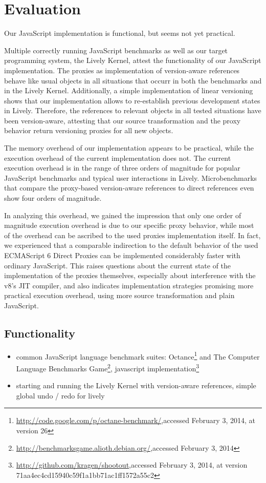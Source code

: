 \chapter{Evaluation} \label{sec:EVALUATION}

Our JavaScript implementation is functional, but seems not yet practical.

Multiple correctly running JavaScript benchmarks as well as our target programming system, the Lively Kernel, attest the functionality of our JavaScript implementation.
The proxies as implementation of version-aware references behave like usual objects in all situations that occurr in both the benchmarks and in the Lively Kernel.
Additionally, a simple implementation of linear versioning shows that our implementation allows to re-establish previous development states in Lively.
Therefore, the references to relevant objects in all tested situations have been version-aware, attesting that our source transformation and the proxy behavior return versioning proxies for all new objects. 

The memory overhead of our implementation appears to be practical, while the execution overhead of the current implementation does not.
The current execution overhead is in the range of three orders of magnitude for popular JavaScript benchmarks and typical user interactions in Lively.
Microbenchmarks that compare the proxy-based version-aware references to direct references even show four orders of magnitude.

In analyzing this overhead, we gained the impression that only one order of magnitude execution overhead is due to our specific proxy behavior, while most of the overhead can be ascribed to the used proxies implementation itself.
In fact, we experienced that a comparable indirection to the default behavior of the used ECMAScript 6 Direct Proxies can be implemented considerably faster with ordinary JavaScript.
This raises questions about the current state of the implementation of the proxies themselves, especially about interference with the v8's JIT compiler, and also indicates implementation strategies promising more practical execution overhead, using more source transformation and plain JavaScript.

\section{Functionality}

\begin{itemize}
    \item common JavaScript language benchmark suites: Octance\footnote{\url{http://code.google.com/p/octane-benchmark/},\goodbreak accessed February 3, 2014, at version 26} and The Computer Language Benchmarks Game\footnote{\url{http://benchmarksgame.alioth.debian.org/},\goodbreak accessed February 3, 2014}, javascript implementation\footnote{\url{http://github.com/kragen/shootout},\goodbreak accessed February 3, 2014, at version 71aa4ec4cd15940c59f1a1bb71ac1ff1572a55c2}
    \item starting and running the Lively Kernel with version-aware references, simple global undo / redo for lively
\end{itemize}



